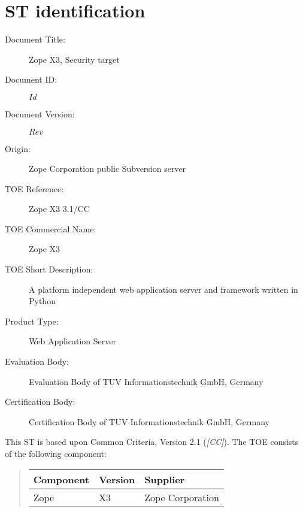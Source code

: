 \documentclass[12pt,english]{scrbook}
\begin{document}
\section{ST identification}

\begin{description}
\item [Document Title:]
Zope X3, Security target


\item [Document ID:]
$Id$


\item [Document Version:]
$Rev$


\item [Origin:]
Zope Corporation public Subversion server


\item [TOE Reference:]
Zope X3 3.1/CC              %


\item [TOE Commercial Name:]
Zope X3                     %


\item [TOE Short Description:]
A platform independent web application server and framework written in Python


\item [Product Type:]
Web Application Server


\item [Evaluation Body:]
Evaluation Body of TUV Informationstechnik GmbH, Germany


\item [Certification Body:]
Certification Body of TUV Informationstechnik GmbH, Germany


\end{description}

This ST is based upon Common Criteria, Version 2.1 (\emph{{[}CC]}).
The TOE consists of the following component:
\begin{quote}

\begin{longtable}[c]{|l|l|l|}
\hline
\textbf{
Component
} & \textbf{
Version
} & \textbf{
Supplier
} \\
\hline
\endhead

Zope
 & 
X3          %
 & 
Zope Corporation
 \\
\hline
\end{longtable}
\end{quote}
\end{document}
